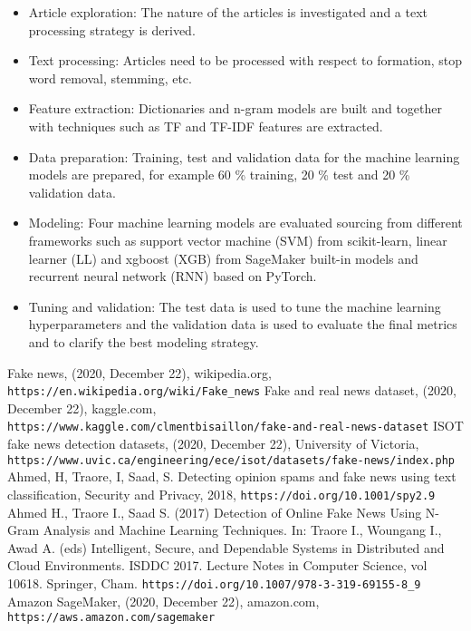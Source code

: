 \documentclass[a4paper,12pt,nottoc]{article}
\begin{document}
\begin{itemize}
\item{Article exploration: The nature of the articles is investigated and a text processing strategy is derived.}
\item{Text processing: Articles need to be processed with respect to formation, stop word removal, stemming, etc.}
\item{Feature extraction: Dictionaries and n-gram models are built and together with techniques such as TF and TF-IDF features are extracted.}
\item{Data preparation: Training, test and validation data for the machine learning models are prepared, for example 60 \% training,  20 \% test and 20 \% validation data.}
\item{Modeling: Four machine learning models are evaluated sourcing from different frameworks such as support vector machine (SVM) from scikit-learn, linear learner (LL) and xgboost (XGB) from SageMaker built-in models and recurrent neural network (RNN) based on PyTorch.}
\item{Tuning and validation: The test data is used to tune the machine learning hyperparameters and the validation data is used to evaluate the final metrics and to clarify the best modeling strategy.}
\end{itemize}

\begin{thebibliography}{9}
 Fake news, (2020, December 22), wikipedia.org, \\\texttt{https://en.wikipedia.org/wiki/Fake\_news}
 Fake and real news dataset, (2020, December 22), kaggle.com, \\\texttt{https://www.kaggle.com/clmentbisaillon/fake-and-real-news-dataset}
 ISOT fake news detection datasets, (2020, December 22), University of Victoria, \texttt{https://www.uvic.ca/engineering/ece/isot/datasets/fake-news/index.php}
 Ahmed, H, Traore, I, Saad, S. Detecting opinion spams and fake news using text classification, Security and Privacy, 2018, \texttt{https://doi.org/10.1001/spy2.9}
 Ahmed H., Traore I., Saad S. (2017) Detection of Online Fake News Using N-Gram Analysis and Machine Learning Techniques. In: Traore I., Woungang I., Awad A. (eds) Intelligent, Secure, and Dependable Systems in Distributed and Cloud Environments. ISDDC 2017. Lecture Notes in Computer Science, vol 10618. Springer, Cham. \texttt{https://doi.org/10.1007/978-3-319-69155-8\_9}
 Amazon SageMaker, (2020, December 22), amazon.com, \\\texttt{https://aws.amazon.com/sagemaker}
\end{thebibliography}
\end{document}
